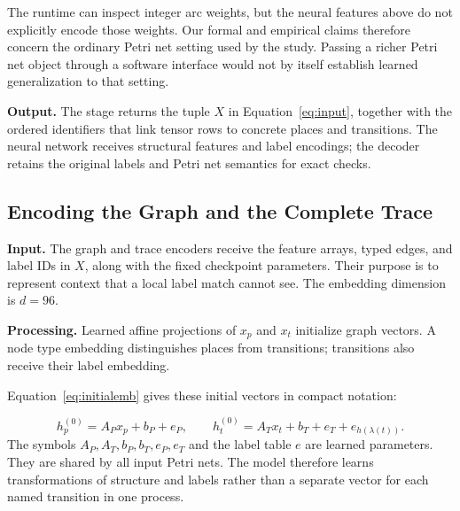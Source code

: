 The runtime can inspect integer arc weights, but the neural features above do not explicitly encode those weights. Our formal and empirical claims therefore concern the ordinary Petri net setting used by the study. Passing a richer Petri net object through a software interface would not by itself establish learned generalization to that setting.

\textbf{Output.} The stage returns the tuple $X$ in Equation~\eqref{eq:input}, together with the ordered identifiers that link tensor rows to concrete places and transitions. The neural network receives structural features and label encodings; the decoder retains the original labels and Petri net semantics for exact checks.

\subsection{Encoding the Graph and the Complete Trace}
\label{sec:scorer}

\textbf{Input.} The graph and trace encoders receive the feature arrays, typed edges, and label IDs in $X$, along with the fixed checkpoint parameters. Their purpose is to represent context that a local label match cannot see. The embedding dimension is $d=96$.

\textbf{Processing.} Learned affine projections of $x_p$ and $x_t$ initialize graph vectors. A node type embedding distinguishes places from transitions; transitions also receive their label embedding. \begin{revised}Equation~\eqref{eq:initialemb} gives these initial vectors in compact notation:\end{revised}
\begin{equation}
 h_p^{(0)}=A_Px_p+b_P+e_P,\qquad
 h_t^{(0)}=A_Tx_t+b_T+e_T+e_{h(\lambda(t))}.
 \label{eq:initialemb}
\end{equation}
The symbols $A_P,A_T,b_P,b_T,e_P,e_T$ and the label table $e$ are learned parameters. They are shared by all input Petri nets. The model therefore learns transformations of structure and labels rather than a separate vector for each named transition in one process.

